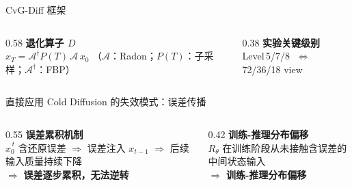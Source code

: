 \documentclass[aspectratio=169,10pt]{beamer}
\newcommand{\hterm}[1]{\textcolor{Brick}{\textbf{#1}}}
\begin{document}
\begin{frame}{CvG-Diff 框架}
  \vspace{0.5em}
  \centering
  \\[0.8em]
  \begin{columns}[T,onlytextwidth]
    \begin{column}{0.58\textwidth}
      \textbf{退化算子 $D$}
      \\[2pt]
      \small $x_T=\mathcal{A}^\dagger P(T)\,\mathcal{A}\,x_0$
      \quad\footnotesize（$\mathcal{A}$：Radon；$P(T)$：子采样；$\mathcal{A}^\dagger$：FBP）
    \end{column}
    \begin{column}{0.38\textwidth}
      \textbf{实验关键级别}
      \\[2pt]
      \centering\small Level\,5/7/8 $\;\Leftrightarrow\;$ 72/36/18 view
    \end{column}
  \end{columns}
\end{frame}

\begin{frame}{直接应用 Cold Diffusion 的失效模式：误差传播}
  \vspace{0.5em}
  \centering
  \\[0.8em]
  \begin{columns}[T,onlytextwidth]
    \begin{column}{0.55\textwidth}
      \textbf{误差累积机制}
      \\[2pt]
      $\hat{x}_0^{\,t}$ 含还原误差 $\Rightarrow$ 误差注入 $x_{t-1}$ $\Rightarrow$ 后续输入质量持续下降
      \\[2pt]
      $\Rightarrow$ \hterm{误差逐步累积，无法逆转}
    \end{column}
    \begin{column}{0.42\textwidth}
      \textbf{训练-推理分布偏移}
      \\[2pt]
      $R_\theta$ 在训练阶段从未接触含误差的中间状态输入
      \\[2pt]
      $\Rightarrow$ \hterm{训练-推理分布偏移}
    \end{column}
  \end{columns}
\end{frame}
\end{document}

